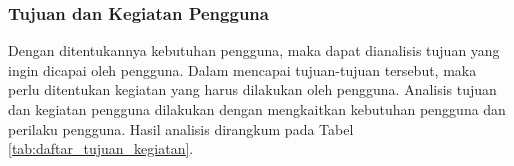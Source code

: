 \subsubsection{Tujuan dan Kegiatan Pengguna}
\label{subsubsec:tujuan_kegiatan_pengguna}

Dengan ditentukannya kebutuhan pengguna, maka dapat dianalisis tujuan yang ingin dicapai oleh pengguna. Dalam mencapai tujuan-tujuan tersebut, maka perlu ditentukan kegiatan yang harus dilakukan oleh pengguna. Analisis tujuan dan kegiatan pengguna dilakukan dengan mengkaitkan kebutuhan pengguna dan perilaku pengguna. Hasil analisis dirangkum pada Tabel \ref{tab:daftar_tujuan_kegiatan}.

\newlength{\cccolgoal}
\setlength{\cccolgoal}{0.3\textwidth}

\newlength{\cccolneed}
\setlength{\cccolneed}{0.13\textwidth}

\newcommand{\ccgoal}[2]{\multirow{#1}{\cccolgoal}{\linespread{1}\selectfont #2}}
\newcommand{\ccneed}[2]{\multirow{#1}{\cccolneed}{\centering\linespread{1}\selectfont #2}}
\newcommand{\ccline}{\hhline{|-|~|-|~|}}


